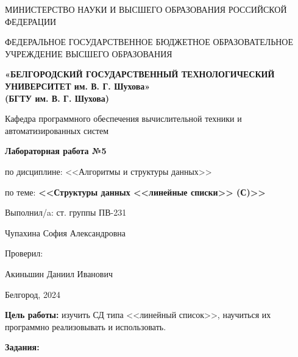 \documentclass[12pt]{article}
\begin{document}
	\begin{center}
		{\parskip=1cm
			МИНИСТЕРСТВО НАУКИ И ВЫСШЕГО ОБРАЗОВАНИЯ РОССИЙСКОЙ ФЕДЕРАЦИИ
			
			ФЕДЕРАЛЬНОЕ ГОСУДАРСТВЕННОЕ БЮДЖЕТНОЕ ОБРАЗОВАТЕЛЬНОЕ УЧРЕЖДЕНИЕ ВЫСШЕГО ОБРАЗОВАНИЯ
			
			{\bf«БЕЛГОРОДСКИЙ ГОСУДАРСТВЕННЫЙ ТЕХНОЛОГИЧЕСКИЙ УНИВЕРСИТЕТ им. В. Г. Шухова»\\(БГТУ им. В. Г. Шухова)}
			
			
			\begin{figure}[bh]
			\noindent{}
			\end{figure}
			Кафедра программного обеспечения вычислительной техники и автоматизированных систем
		}
		{\parskip=0.25cm
			{\Large 
				{\bf Лабораторная работа №5}
			
				по дисциплине: <<Алгоритмы и структуры данных>>
			
				по теме: {\bf <<Структуры данных <<линейные списки>> (С)>>}
			}
		}
	\end{center}
	\begin{flushright}
		{\parskip=3cm Выполнил/a: ст. группы ПВ-231}
		
		Чупахина София Александровна
		
		Проверил:
		
		Акиньшин Даниил Иванович
	\end{flushright}
	\begin{center}
		{\parskip=3cm Белгород, 2024}
	\end{center}
	\newpage
	
	{\bf Цель работы:} изучить СД типа <<линейный список>>, научиться их программно реализовывать и использовать.
	
	
	{\bf Задания:}
	
	
\end{document}
